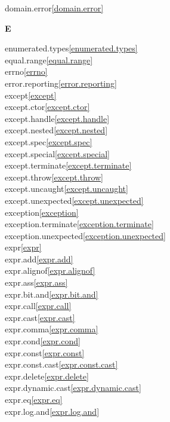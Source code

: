 \begin{multicols}{2}
domain.error\quad\ref{domain.error}\\
\par \textbf{E}\par
enumerated.types\quad\ref{enumerated.types}\\
equal.range\quad\ref{equal.range}\\
errno\quad\ref{errno}\\
error.reporting\quad\ref{error.reporting}\\
except\quad\ref{except}\\
except.ctor\quad\ref{except.ctor}\\
except.handle\quad\ref{except.handle}\\
except.nested\quad\ref{except.nested}\\
except.spec\quad\ref{except.spec}\\
except.special\quad\ref{except.special}\\
except.terminate\quad\ref{except.terminate}\\
except.throw\quad\ref{except.throw}\\
except.uncaught\quad\ref{except.uncaught}\\
except.unexpected\quad\ref{except.unexpected}\\
exception\quad\ref{exception}\\
exception.terminate\quad\ref{exception.terminate}\\
exception.unexpected\quad\ref{exception.unexpected}\\
expr\quad\ref{expr}\\
expr.add\quad\ref{expr.add}\\
expr.alignof\quad\ref{expr.alignof}\\
expr.ass\quad\ref{expr.ass}\\
expr.bit.and\quad\ref{expr.bit.and}\\
expr.call\quad\ref{expr.call}\\
expr.cast\quad\ref{expr.cast}\\
expr.comma\quad\ref{expr.comma}\\
expr.cond\quad\ref{expr.cond}\\
expr.const\quad\ref{expr.const}\\
expr.const.cast\quad\ref{expr.const.cast}\\
expr.delete\quad\ref{expr.delete}\\
expr.dynamic.cast\quad\ref{expr.dynamic.cast}\\
expr.eq\quad\ref{expr.eq}\\
expr.log.and\quad\ref{expr.log.and}\\

\end{multicols}

